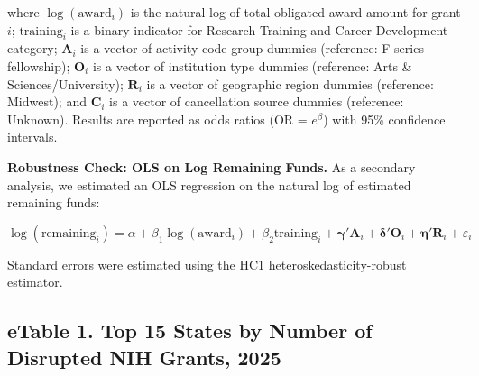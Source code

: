 \documentclass[10pt, letterpaper]{article}
\begin{document}
where $\log(\text{award}_{i})$ is the natural log of total obligated award amount for grant $i$; $\text{training}_{i}$ is a binary indicator for Research Training and Career Development category; $\mathbf{A}_{i}$ is a vector of activity code group dummies (reference: F-series fellowship); $\mathbf{O}_{i}$ is a vector of institution type dummies (reference: Arts \& Sciences/University); $\mathbf{R}_{i}$ is a vector of geographic region dummies (reference: Midwest); and $\mathbf{C}_{i}$ is a vector of cancellation source dummies (reference: Unknown). Results are reported as odds ratios (OR = $e^{\beta}$) with 95\% confidence intervals.

\textbf{Robustness Check: OLS on Log Remaining Funds.}
As a secondary analysis, we estimated an OLS regression on the natural log of estimated remaining funds:

\[
\log(\text{remaining}_{i}) = \alpha + \beta_1 \log(\text{award}_{i}) + \beta_2 \text{training}_{i} + \boldsymbol{\gamma}'\mathbf{A}_{i} + \boldsymbol{\delta}'\mathbf{O}_{i} + \boldsymbol{\eta}'\mathbf{R}_{i} + \varepsilon_{i}
\]

Standard errors were estimated using the HC1 heteroskedasticity-robust estimator.\cite{white1980het}

\subsection*{eTable 1. Top 15 States by Number of Disrupted NIH Grants, 2025}
\end{document}
